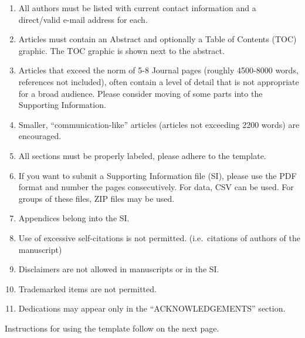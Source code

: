 \documentclass[english]{jasb}
\begin{document}
\begin{enumerate}
\item All authors must be listed with current contact information and a direct/valid e-mail address for each.
\item Articles must contain an Abstract and optionally a Table of Contents (TOC) graphic. The TOC graphic is shown next to the abstract.
\item Articles that exceed the norm of 5-8 Journal pages (roughly 4500-8000 words, references not included), often contain a level of detail that is not appropriate for a broad audience. Please consider moving of some parts into the Supporting Information.
\item Smaller, ``communication-like'' articles (articles not exceeding 2200 words) are encouraged.
\item All sections must be properly labeled, please adhere to the template.
\item If you want to submit a Supporting Information file (SI), please use the PDF format and number the pages consecutively. For data, CSV can be used. For groups of these files, ZIP files may be used.
\item Appendices belong into the SI.
\item Use of excessive self-citations is not permitted. (i.e.\ citations of authors of the manuscript)
\item Disclaimers are not allowed in manuscripts or in the SI.
\item Trademarked items are not permitted.
\item Dedications may appear only in the ``ACKNOWLEDGEMENTS'' section.
\end{enumerate}
Instructions for using the template follow on the next page.
\newpage
\end{document}
